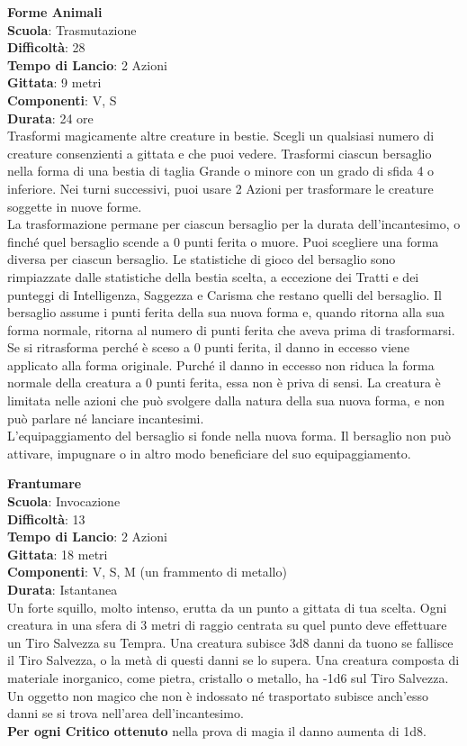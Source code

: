 \begin{multicols}{2}
\medskip\textbf{Forme Animali}\\
\textbf{Scuola}: Trasmutazione\\
\textbf{Difficoltà}:  28\\
\textbf{Tempo di Lancio}: 2 Azioni\\
\textbf{Gittata}: 9 metri\\
\textbf{Componenti}: V, S\\
\textbf{Durata}: 24 ore\\
Trasformi magicamente altre creature in bestie. Scegli un qualsiasi numero di creature consenzienti a gittata e che puoi vedere. Trasformi ciascun bersaglio nella forma di una bestia di taglia Grande o minore con un grado di sfida 4 o inferiore. Nei turni successivi, puoi usare 2 Azioni per trasformare le creature soggette in nuove forme.\\
La trasformazione permane per ciascun bersaglio per la durata dell'incantesimo, o finché quel bersaglio scende a 0 punti ferita o muore. Puoi scegliere una forma diversa per ciascun bersaglio. Le  statistiche di gioco del bersaglio sono rimpiazzate dalle statistiche della bestia scelta, a eccezione dei Tratti e dei punteggi di Intelligenza, Saggezza e Carisma che restano quelli del
bersaglio. Il bersaglio assume i punti ferita della sua nuova forma e, quando ritorna alla sua forma normale, ritorna al numero di punti ferita che aveva prima di trasformarsi. Se si ritrasforma perché è sceso a 0 punti ferita, il danno in eccesso viene applicato alla forma originale. Purché il danno in eccesso non riduca la forma normale della creatura a 0 punti ferita, essa non è priva di sensi. La creatura è limitata nelle azioni che può svolgere dalla natura della sua nuova forma, e non può parlare né lanciare incantesimi.\\
L’equipaggiamento del bersaglio si fonde nella nuova forma. Il bersaglio non può attivare, impugnare o in altro modo beneficiare del suo equipaggiamento.

\medskip\textbf{Frantumare}\\
\textbf{Scuola}: Invocazione\\
\textbf{Difficoltà}:  13\\
\textbf{Tempo di Lancio}: 2 Azioni\\
\textbf{Gittata}: 18 metri\\
\textbf{Componenti}: V, S, M (un frammento di metallo)\\
\textbf{Durata}: Istantanea\\
Un forte squillo, molto intenso, erutta da un punto a gittata di tua scelta. Ogni creatura in una sfera di 3 metri di raggio centrata su quel punto deve effettuare un Tiro Salvezza su Tempra. Una creatura subisce 3d8 danni da tuono se fallisce il Tiro Salvezza, o la metà di questi danni se lo supera. Una creatura composta di materiale inorganico, come pietra, cristallo o metallo, ha -1d6 sul Tiro Salvezza. Un oggetto non magico che non è indossato né trasportato subisce anch’esso danni se si trova nell'area dell'incantesimo.\\
\textbf{Per ogni Critico ottenuto} nella prova di magia il danno aumenta di 1d8.


\end{multicols}
